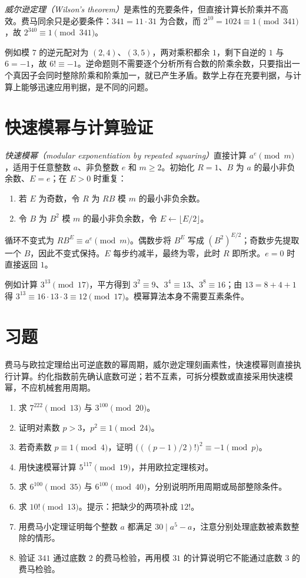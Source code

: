 \emph{威尔逊定理（Wilson's theorem）}是素性的充要条件，但直接计算长阶乘并不高效。费马同余只是必要条件：$341=11\cdot31$ 为合数，而 $2^{10}=1024\equiv1\pmod{341}$，故 $2^{340}\equiv1\pmod{341}$。

例如模 $7$ 的逆元配对为 $(2,4)$、$(3,5)$，两对乘积都余 $1$，剩下自逆的 $1$ 与 $6=-1$，故 $6!\equiv-1$。逆命题则不需要逐个分析所有合数的阶乘余数，只要指出一个真因子会同时整除阶乘和阶乘加一，就已产生矛盾。数学上存在充要判据，与计算上能够迅速应用判据，是不同的问题。

\section{快速模幂与计算验证}

\emph{快速模幂（modular exponentiation by repeated squaring）}直接计算 $a^e\pmod m$，适用于任意整数 $a$、非负整数 $e$ 和 $m\ge2$。初始化 $R=1$、$B$ 为 $a$ 的最小非负余数、$E=e$；在 $E>0$ 时重复：
\begin{enumerate}
 \item 若 $E$ 为奇数，令 $R$ 为 $RB$ 模 $m$ 的最小非负余数。
 \item 令 $B$ 为 $B^2$ 模 $m$ 的最小非负余数，令 $E\leftarrow\lfloor E/2\rfloor$。
\end{enumerate}
循环不变式为 $RB^E\equiv a^e\pmod m$。偶数步将 $B^E$ 写成 $(B^2)^{E/2}$；奇数步先提取一个 $B$，因此不变式保持。$E$ 每步约减半，最终为零，此时 $R$ 即所求。$e=0$ 时直接返回 $1$。

例如计算 $3^{13}\pmod{17}$，平方得到 $3^2\equiv9$、$3^4\equiv13$、$3^8\equiv16$；由 $13=8+4+1$ 得 $3^{13}\equiv16\cdot13\cdot3\equiv12\pmod{17}$。模幂算法本身不需要互素条件。

\section{习题}

费马与欧拉定理给出可逆底数的幂周期，威尔逊定理刻画素性，快速模幂则直接执行计算。约化指数前先确认底数可逆；若不互素，可拆分模数或直接采用快速模幂，不应机械套用周期。

\begin{enumerate}
 \item 求 $7^{222}\pmod{13}$ 与 $3^{100}\pmod{20}$。
 \item 证明对素数 $p>3$，$p^2\equiv1\pmod{24}$。
 \item 若奇素数 $p\equiv1\pmod4$，证明 $\bigl(((p-1)/2)!\bigr)^2\equiv-1\pmod p$。
 \item 用快速模幂计算 $5^{117}\pmod{19}$，并用欧拉定理核对。
 \item\label{ex:classical-noncoprime} 求 $6^{100}\pmod{35}$ 与 $6^{100}\pmod{40}$，分别说明所用周期或局部整除条件。
 \item\label{ex:classical-factorial} 求 $10!\pmod{13}$。提示：把缺少的两项补成 $12!$。
 \item\label{ex:classical-fermat-all} 用费马小定理证明每个整数 $a$ 都满足 $30\mid a^5-a$，注意分别处理底数被素数整除的情形。
 \item\label{ex:classical-pseudoprime} 验证 $341$ 通过底数 $2$ 的费马检验，再用模 $31$ 的计算说明它不能通过底数 $3$ 的费马检验。
\end{enumerate}

